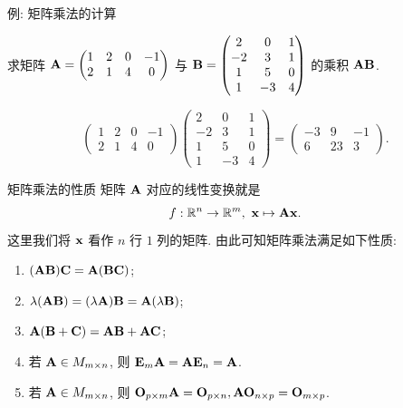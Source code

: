 \begin{frame}{例: 矩阵乘法的计算}
	\onslide<+->
	\begin{example}
		求矩阵 ${\mathbf{A}}=\begin{pmatrix}
			1&2&0&-1\\2&1&4&0
		\end{pmatrix}$ 与 ${\mathbf{B}}=\begin{pmatrix}
			2&0&1\\
			-2&3&1\\
			1&5&0\\
			1&-3&4
		\end{pmatrix}$ 的乘积 ${\mathbf{A}}{\mathbf{B}}$.
	\end{example}
	\onslide<+->
	\begin{solution}
		\[\begin{pmatrix}
			1&2&0&-1\\2&1&4&0
		\end{pmatrix}\begin{pmatrix}
			2&0&1\\
			-2&3&1\\
			1&5&0\\
			1&-3&4
		\end{pmatrix}=\begin{pmatrix}
			-3&9&-1\\
			6&23&3
		\end{pmatrix}.\]
	\end{solution}
\end{frame}


\begin{frame}{矩阵乘法的性质}
	\onslide<+->
	矩阵 ${\mathbf{A}}$ 对应的线性变换就是
	\[f:{\mathbb{R}}^n\to{\mathbb{R}}^m,\ {\mathbf{x}}\mapsto {\mathbf{A}}{\mathbf{x}}.\]
	这里我们将 ${\mathbf{x}}$ 看作 $n$ 行 $1$ 列的矩阵.
	\onslide<+->
	由此可知矩阵乘法满足如下性质:
	\begin{enumerate}
		\item $({\mathbf{A}}{\mathbf{B}}){\mathbf{C}}={\mathbf{A}}({\mathbf{B}}{\mathbf{C}})$;
		\item $\lambda({\mathbf{A}}{\mathbf{B}})=(\lambda{\mathbf{A}}){\mathbf{B}}={\mathbf{A}}(\lambda{\mathbf{B}})$;
		\item ${\mathbf{A}}({\mathbf{B}}+{\mathbf{C}})={\mathbf{A}}{\mathbf{B}}+{\mathbf{A}}{\mathbf{C}}$;
		\item 若 ${\mathbf{A}}\in M_{m\times n}$, 则 ${\mathbf{E}}_m {\mathbf{A}}={\mathbf{A}}{\mathbf{E}}_n={\mathbf{A}}$.
		\item 若 ${\mathbf{A}}\in M_{m\times n}$, 则 ${\mathbf{O}}_{p\times m} {\mathbf{A}}={\mathbf{O}}_{p\times n}, {\mathbf{A}}{\mathbf{O}}_{n\times p}={\mathbf{O}}_{m\times p}$.
	\end{enumerate}
\end{frame}


